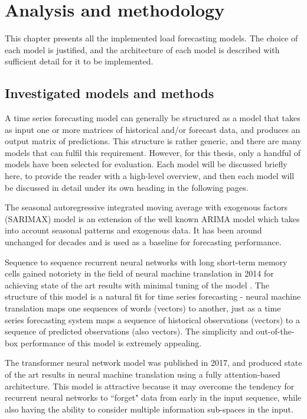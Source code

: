 \chapter{Analysis and methodology}
\label{ana-meth}

This chapter presents all the implemented load forecasting models.
The choice of each model is justified, and the architecture of each model is described with sufficient detail for it to be implemented.

\section{Investigated models and methods}

A time series forecasting model can generally be structured as a model that takes as input one or more matrices of historical and/or forecast data, and produces an output matrix of predictions.
This structure is rather generic, and there are many models that can fulfil this requirement.
However, for this thesis, only a handful of models have been selected for evaluation.
Each model will be discussed briefly here, to provide the reader with a high-level overview, and then each model will be discussed in detail under its own heading in the following pages.

The seasonal autoregressive integrated moving average with exogenous factors (SARIMAX) model is an extension of the well known ARIMA \cite{Box1970} model which takes into account seasonal patterns and exogenous data.
It has been around unchanged for decades and is used as a baseline for forecasting performance.

Sequence to sequence recurrent neural networks with long short-term memory cells gained notoriety in the field of neural machine translation in 2014 for achieving state of the art results with minimal tuning of the model \cite{sutskever2014sequence}.
The structure of this model is a natural fit for time series forecasting - neural machine translation maps one sequences of words (vectors) to another, just as a time series forecasting system maps a sequence of historical observations (vectors) to a sequence of predicted observations (also vectors).
The simplicity and out-of-the-box performance of this model is extremely appealing.

The transformer neural network model was published in 2017, and produced state of the art results in neural machine translation using a fully attention-based architecture.
This model is attractive because it may overcome the tendency for recurrent neural networks to ``forget" data from early in the input sequence, while also having the ability to consider multiple information sub-spaces in the input.

